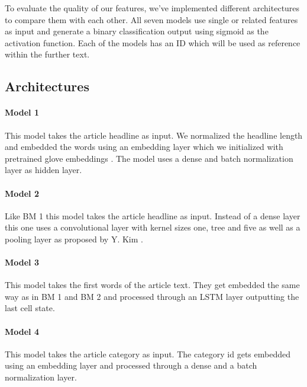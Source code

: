 To evaluate the quality of our features, we've implemented different architectures to compare them with each other.
All seven models use single or related features as input and generate a binary classification output using sigmoid as the activation function. Each of the models has an ID which will be used as reference within the further text.

\subsection{Architectures}

\paragraph{Model 1} This model takes the article headline as input. We normalized the headline length and embedded the words using an embedding layer which we initialized with pretrained glove embeddings \cite{pennington2014glove}. The model uses a dense and batch normalization layer as hidden layer.
\paragraph{Model 2} Like BM 1 this model takes the article headline as input. Instead of a dense layer this one uses a convolutional layer with kernel sizes one, tree and five as well as a pooling layer as proposed by Y. Kim \cite{kim2014convolutional}.
\paragraph{Model 3} This model takes the first words of the article text. They get embedded the same way as in BM 1 and BM 2 and processed through an LSTM layer outputting the last cell state.
\paragraph{Model 4} This model takes the article category as input. The category id gets embedded using an embedding layer and processed through a dense and a batch normalization layer.
